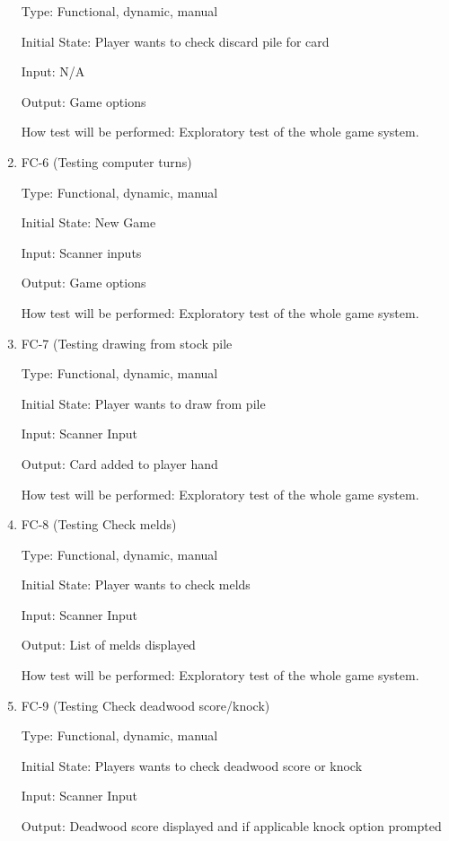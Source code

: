 \documentclass[12pt, titlepage]{article}
\begin{document}
\begin{enumerate}
Type: Functional, dynamic, manual
					
Initial State: Player wants to check discard pile for card
					
Input: N/A
					
Output: Game options
					
How test will be performed: Exploratory test of the whole game system.

\item{FC-6 (Testing computer turns)\\}

Type: Functional, dynamic, manual
					
Initial State: New Game
					
Input: Scanner inputs
					
Output: Game options
					
How test will be performed: Exploratory test of the whole game system.

\item{FC-7 (Testing drawing from stock pile \\}

Type: Functional, dynamic, manual
					
Initial State: Player wants to draw from pile
					
Input: Scanner Input
					
Output: Card added to player hand
					
How test will be performed: Exploratory test of the whole game system.

\item{FC-8 (Testing Check melds)\\}

Type: Functional, dynamic, manual
					
Initial State: Player wants to check melds
					
Input: Scanner Input
					
Output: List of melds displayed
					
How test will be performed: Exploratory test of the whole game system.

\item{FC-9 (Testing Check deadwood score/knock) \\}

Type: Functional, dynamic, manual
					
Initial State: Players wants to check deadwood score or knock
					
Input: Scanner Input
					
Output: Deadwood score displayed and if applicable knock option prompted
					

\end{enumerate}
\end{document}

